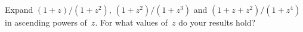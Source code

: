 Expand $(1 + z)/(1 + z^{2})$, $(1 + z^{2})/(1 + z^{3})$ and $(1 + z + z^{2})/(1 + z^{4})$ in ascending
powers of~$z$. For what values of~$z$ do your results hold?

